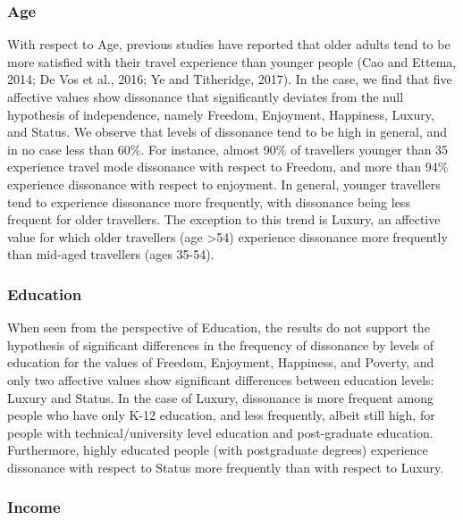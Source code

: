 \documentclass[]{elsarticle} %
\begin{document}
\hypertarget{age}{%
\subsubsection{Age}\label{age}}

With respect to Age, previous studies have reported that older adults
tend to be more satisfied with their travel experience than younger
people (Cao and Ettema, 2014; De Vos et al., 2016; Ye and Titheridge,
2017). In the case, we find that five affective values show dissonance
that significantly deviates from the null hypothesis of independence,
namely Freedom, Enjoyment, Happiness, Luxury, and Status. We observe
that levels of dissonance tend to be high in general, and in no case
less than 60\%. For instance, almost 90\% of travellers younger than 35
experience travel mode dissonance with respect to Freedom, and more than
94\% experience dissonance with respect to enjoyment. In general,
younger travellers tend to experience dissonance more frequently, with
dissonance being less frequent for older travellers. The exception to
this trend is Luxury, an affective value for which older travellers (age
\textgreater54) experience dissonance more frequently than mid-aged
travellers (ages 35-54).

\hypertarget{education}{%
\subsubsection{Education}\label{education}}

When seen from the perspective of Education, the results do not support
the hypothesis of significant differences in the frequency of dissonance
by levels of education for the values of Freedom, Enjoyment, Happiness,
and Poverty, and only two affective values show significant differences
between education levels: Luxury and Status. In the case of Luxury,
dissonance is more frequent among people who have only K-12 education,
and less frequently, albeit still high, for people with
technical/university level education and post-graduate education.
Furthermore, highly educated people (with postgraduate degrees)
experience dissonance with respect to Status more frequently than with
respect to Luxury.

\hypertarget{income}{%
\subsubsection{Income}\label{income}}
\end{document}
